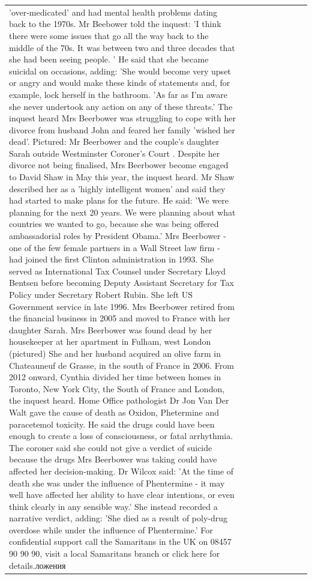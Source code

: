 \begin{table}[H]
\begin{tabular}{lllrlllll}
'over-medicated' and had mental health problems dating back to the 1970s. Mr Beebower told the inquest: 'I think there were some issues that go all the way back to the middle of the 70s. It was between two and three decades that she had been seeing people. ' He said that she became suicidal on occasions, adding: 'She would become very upset or angry and would make these kinds of statements and, for example, lock herself in the bathroom. 'As far as I'm aware she never undertook any action on any of these threats.' The inquest heard Mrs Beerbower was struggling to cope with her divorce from husband John and feared her family 'wished her dead'. Pictured: Mr Beerbower and the couple's daughter Sarah outside Westminster Coroner's Court . Despite her divorce not being finalised, Mrs Beerbower become engaged to David Shaw in May this year, the inquest heard. Mr Shaw described her as a 'highly intelligent women' and said they had started to make plans for the future. He said: 'We were planning for the next 20 years. We were planning about what countries we wanted to go, because she was being offered ambassadorial roles by President Obama.' Mrs Beerbower - one of the few female partners in a Wall Street law firm - had joined the first Clinton administration in 1993. She served as International Tax Counsel under Secretary Lloyd Bentsen before becoming Deputy Assistant Secretary for Tax Policy under Secretary Robert Rubin. She left US Government service in late 1996. Mrs Beerbower retired from the financial business in 2005 and moved to France with her daughter Sarah. Mrs Beerbower was found dead by her housekeeper at her apartment in Fulham, west London (pictured) She and her husband acquired an olive farm in Chateauneuf de Grasse, in the south of France in 2006. From 2012 onward, Cynthia divided her time between homes in Toronto, New York City, the South of France and London, the inquest heard. Home Office pathologist Dr Jon Van Der Walt gave the cause of death as Oxidon, Phetermine and paracetemol toxicity. He said the drugs could have been enough to create a loss of consciousness, or fatal arrhythmia. The coroner said she could not give a verdict of suicide because the drugs Mrs Beerbower was taking could have affected her decision-making. Dr Wilcox said: 'At the time of death she was under the influence of Phentermine - it may well have affected her ability to have clear intentions, or even think clearly in any sensible way.' She instead recorded a narrative verdict, adding: 'She died as a result of poly-drug overdose while under the influence of Phentermine.' For confidential support call the Samaritans in the UK on 08457 90 90 90, visit a local Samaritans branch or click here for details.ложения \\

\end{tabular}
\end{table}

